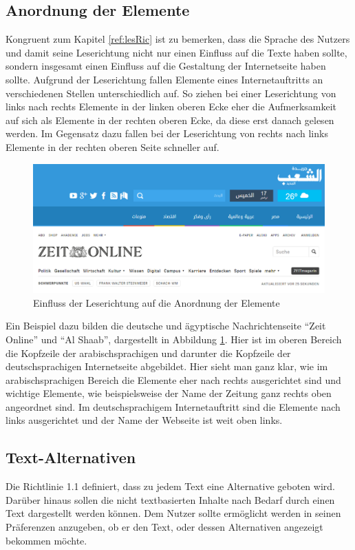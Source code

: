 \documentclass[12pt, paper=a4, bibtotoc, toc=listof, headsepline=true]{scrreprt}
\begin{document}
\subsection{Anordnung der Elemente}
Kongruent zum Kapitel \ref{ref:lesRic} ist zu bemerken, dass die Sprache des Nutzers und damit seine Leserichtung nicht nur einen Einfluss auf die Texte haben sollte, sondern insgesamt einen Einfluss auf die Gestaltung der Internetseite haben sollte. Aufgrund der Leserichtung fallen Elemente eines Internetauftritts an verschiedenen Stellen unterschiedlich auf. So ziehen bei einer Leserichtung von links nach rechts Elemente in der linken oberen Ecke eher die Aufmerksamkeit auf sich als Elemente in der rechten oberen Ecke, da diese erst danach gelesen werden. Im Gegensatz dazu fallen bei der Leserichtung von rechts nach links Elemente in der rechten oberen Seite schneller auf\cite[S.47 f.]{meidl2013global}.
\begin{figure}
	\centering
	\includegraphics[width=\textwidth,height=\textheight,keepaspectratio]{leserichtung.png}
	\caption[Einfluss der Leserichtung auf Anordnung der Elemente]{Einfluss der Leserichtung auf die Anordnung der Elemente\cite{elShaab}\cite{zeitOnline}}
	\label{img:lesRic}
\end{figure}
Ein Beispiel dazu bilden die deutsche und ägyptische Nachrichtenseite \enquote{Zeit Online} und \enquote{Al Shaab}, dargestellt in Abbildung  \ref{img:lesRic}. Hier ist im oberen Bereich die Kopfzeile der arabischsprachigen und darunter die Kopfzeile der deutschsprachigen Internetseite abgebildet. Hier sieht man ganz klar, wie im arabischsprachigen Bereich die Elemente eher nach rechts ausgerichtet sind und wichtige Elemente, wie beispielsweise der Name der Zeitung ganz rechts oben angeordnet sind. Im deutschsprachigem Internetauftritt sind die Elemente nach links ausgerichtet und der Name der Webseite ist weit oben links.
\subsection{Text-Alternativen}
Die Richtlinie 1.1 definiert, dass zu jedem Text eine Alternative geboten wird. Darüber hinaus sollen die nicht textbasierten Inhalte nach Bedarf durch einen Text dargestellt werden können. Dem Nutzer sollte ermöglicht werden in seinen Präferenzen anzugeben, ob er den Text, oder dessen Alternativen angezeigt bekommen möchte.
\end{document}

